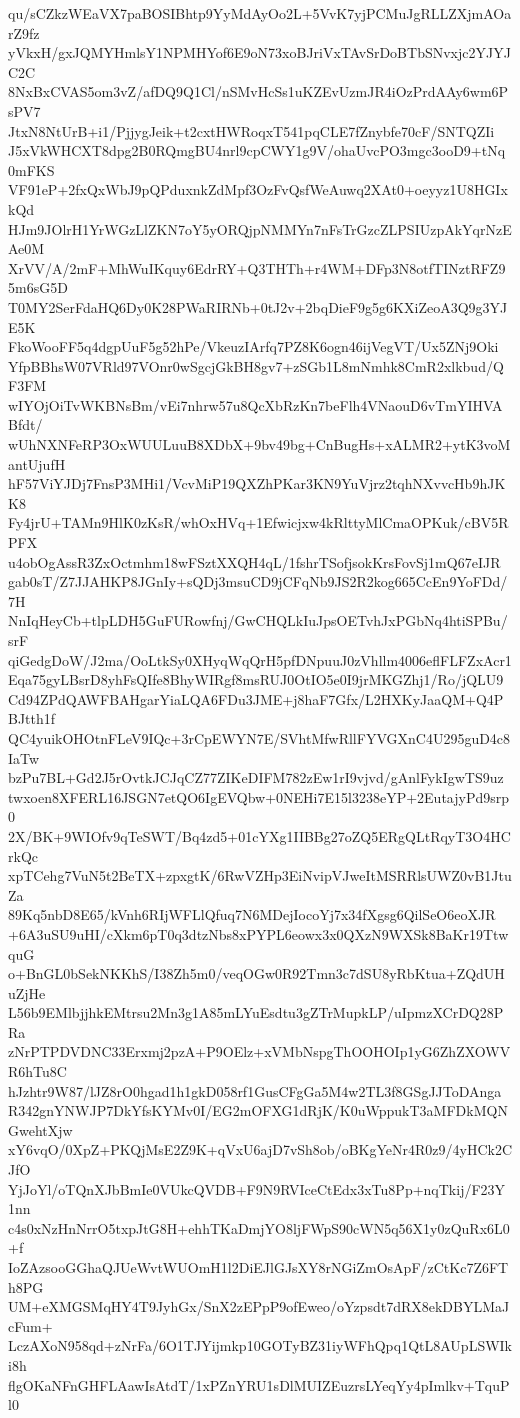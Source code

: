 qu/sCZkzWEaVX7paBOSIBhtp9YyMdAyOo2L+5VvK7yjPCMuJgRLLZXjmAOarZ9fz
yVkxH/gxJQMYHmlsY1NPMHYof6E9oN73xoBJriVxTAvSrDoBTbSNvxjc2YJYJC2C
8NxBxCVAS5om3vZ/afDQ9Q1Cl/nSMvHcSs1uKZEvUzmJR4iOzPrdAAy6wm6PsPV7
JtxN8NtUrB+i1/PjjygJeik+t2cxtHWRoqxT541pqCLE7fZnybfe70cF/SNTQZIi
J5xVkWHCXT8dpg2B0RQmgBU4nrl9cpCWY1g9V/ohaUvcPO3mgc3ooD9+tNq0mFKS
VF91eP+2fxQxWbJ9pQPduxnkZdMpf3OzFvQsfWeAuwq2XAt0+oeyyz1U8HGIxkQd
HJm9JOlrH1YrWGzLlZKN7oY5yORQjpNMMYn7nFsTrGzcZLPSIUzpAkYqrNzEAe0M
XrVV/A/2mF+MhWuIKquy6EdrRY+Q3THTh+r4WM+DFp3N8otfTINztRFZ95m6sG5D
T0MY2SerFdaHQ6Dy0K28PWaRIRNb+0tJ2v+2bqDieF9g5g6KXiZeoA3Q9g3YJE5K
FkoWooFF5q4dgpUuF5g52hPe/VkeuzIArfq7PZ8K6ogn46ijVegVT/Ux5ZNj9Oki
YfpBBhsW07VRld97VOnr0wSgcjGkBH8gv7+zSGb1L8mNmhk8CmR2xlkbud/QF3FM
wIYOjOiTvWKBNsBm/vEi7nhrw57u8QcXbRzKn7beFlh4VNaouD6vTmYIHVABfdt/
wUhNXNFeRP3OxWUULuuB8XDbX+9bv49bg+CnBugHs+xALMR2+ytK3voMantUjufH
hF57ViYJDj7FnsP3MHi1/VcvMiP19QXZhPKar3KN9YuVjrz2tqhNXvvcHb9hJKK8
Fy4jrU+TAMn9HlK0zKsR/whOxHVq+1Efwicjxw4kRlttyMlCmaOPKuk/cBV5RPFX
u4obOgAssR3ZxOctmhm18wFSztXXQH4qL/1fshrTSofjsokKrsFovSj1mQ67eIJR
gab0sT/Z7JJAHKP8JGnIy+sQDj3msuCD9jCFqNb9JS2R2kog665CcEn9YoFDd/7H
NnIqHeyCb+tlpLDH5GuFURowfnj/GwCHQLkIuJpsOETvhJxPGbNq4htiSPBu/srF
qiGedgDoW/J2ma/OoLtkSy0XHyqWqQrH5pfDNpuuJ0zVhllm4006eflFLFZxAcr1
Eqa75gyLBsrD8yhFsQIfe8BhyWIRgf8msRUJ0OtIO5e0I9jrMKGZhj1/Ro/jQLU9
Cd94ZPdQAWFBAHgarYiaLQA6FDu3JME+j8haF7Gfx/L2HXKyJaaQM+Q4PBJtth1f
QC4yuikOHOtnFLeV9IQc+3rCpEWYN7E/SVhtMfwRllFYVGXnC4U295guD4c8IaTw
bzPu7BL+Gd2J5rOvtkJCJqCZ77ZIKeDIFM782zEw1rI9vjvd/gAnlFykIgwTS9uz
twxoen8XFERL16JSGN7etQO6IgEVQbw+0NEHi7E15l3238eYP+2EutajyPd9srp0
2X/BK+9WIOfv9qTeSWT/Bq4zd5+01cYXg1IIBBg27oZQ5ERgQLtRqyT3O4HCrkQc
xpTCehg7VuN5t2BeTX+zpxgtK/6RwVZHp3EiNvipVJweItMSRRlsUWZ0vB1JtuZa
89Kq5nbD8E65/kVnh6RIjWFLlQfuq7N6MDejIocoYj7x34fXgsg6QilSeO6eoXJR
+6A3uSU9uHI/cXkm6pT0q3dtzNbs8xPYPL6eowx3x0QXzN9WXSk8BaKr19TtwquG
o+BnGL0bSekNKKhS/I38Zh5m0/veqOGw0R92Tmn3c7dSU8yRbKtua+ZQdUHuZjHe
L56b9EMlbjjhkEMtrsu2Mn3g1A85mLYuEsdtu3gZTrMupkLP/uIpmzXCrDQ28PRa
zNrPTPDVDNC33Erxmj2pzA+P9OElz+xVMbNspgThOOHOIp1yG6ZhZXOWVR6hTu8C
hJzhtr9W87/lJZ8rO0hgad1h1gkD058rf1GusCFgGa5M4w2TL3f8GSgJJToDAnga
R342gnYNWJP7DkYfsKYMv0I/EG2mOFXG1dRjK/K0uWppukT3aMFDkMQNGwehtXjw
xY6vqO/0XpZ+PKQjMsE2Z9K+qVxU6ajD7vSh8ob/oBKgYeNr4R0z9/4yHCk2CJfO
YjJoYl/oTQnXJbBmIe0VUkcQVDB+F9N9RVIceCtEdx3xTu8Pp+nqTkij/F23Y1nn
c4s0xNzHnNrrO5txpJtG8H+ehhTKaDmjYO8ljFWpS90cWN5q56X1y0zQuRx6L0+f
IoZAzsooGGhaQJUeWvtWUOmH1l2DiEJlGJsXY8rNGiZmOsApF/zCtKc7Z6FTh8PG
UM+eXMGSMqHY4T9JyhGx/SnX2zEPpP9ofEweo/oYzpsdt7dRX8ekDBYLMaJcFum+
LczAXoN958qd+zNrFa/6O1TJYijmkp10GOTyBZ31iyWFhQpq1QtL8AUpLSWIki8h
flgOKaNFnGHFLAawIsAtdT/1xPZnYRU1sDlMUIZEuzrsLYeqYy4pImlkv+TquPl0
